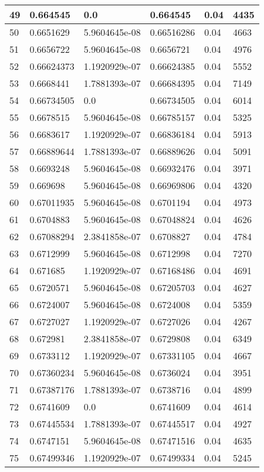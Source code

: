 \begin{longtable}{|l|l|l|l|l|l|}
49 & 0.664545 & 0.0 & 0.664545 & 0.04 & 4435 \\ \hline 
50 & 0.6651629 & 5.9604645e-08 & 0.66516286 & 0.04 & 4663 \\ \hline 
51 & 0.6656722 & 5.9604645e-08 & 0.6656721 & 0.04 & 4976 \\ \hline 
52 & 0.66624373 & 1.1920929e-07 & 0.66624385 & 0.04 & 5552 \\ \hline 
53 & 0.6668441 & 1.7881393e-07 & 0.66684395 & 0.04 & 7149 \\ \hline 
54 & 0.66734505 & 0.0 & 0.66734505 & 0.04 & 6014 \\ \hline 
55 & 0.6678515 & 5.9604645e-08 & 0.66785157 & 0.04 & 5325 \\ \hline 
56 & 0.6683617 & 1.1920929e-07 & 0.66836184 & 0.04 & 5913 \\ \hline 
57 & 0.66889644 & 1.7881393e-07 & 0.66889626 & 0.04 & 5091 \\ \hline 
58 & 0.6693248 & 5.9604645e-08 & 0.66932476 & 0.04 & 3971 \\ \hline 
59 & 0.669698 & 5.9604645e-08 & 0.66969806 & 0.04 & 4320 \\ \hline 
60 & 0.67011935 & 5.9604645e-08 & 0.6701194 & 0.04 & 4973 \\ \hline 
61 & 0.6704883 & 5.9604645e-08 & 0.67048824 & 0.04 & 4626 \\ \hline 
62 & 0.67088294 & 2.3841858e-07 & 0.6708827 & 0.04 & 4784 \\ \hline 
63 & 0.6712999 & 5.9604645e-08 & 0.6712998 & 0.04 & 7270 \\ \hline 
64 & 0.671685 & 1.1920929e-07 & 0.67168486 & 0.04 & 4691 \\ \hline 
65 & 0.6720571 & 5.9604645e-08 & 0.67205703 & 0.04 & 4627 \\ \hline 
66 & 0.6724007 & 5.9604645e-08 & 0.6724008 & 0.04 & 5359 \\ \hline 
67 & 0.6727027 & 1.1920929e-07 & 0.6727026 & 0.04 & 4267 \\ \hline 
68 & 0.672981 & 2.3841858e-07 & 0.6729808 & 0.04 & 6349 \\ \hline 
69 & 0.6733112 & 1.1920929e-07 & 0.67331105 & 0.04 & 4667 \\ \hline 
70 & 0.67360234 & 5.9604645e-08 & 0.6736024 & 0.04 & 3951 \\ \hline 
71 & 0.67387176 & 1.7881393e-07 & 0.6738716 & 0.04 & 4899 \\ \hline 
72 & 0.6741609 & 0.0 & 0.6741609 & 0.04 & 4614 \\ \hline 
73 & 0.67445534 & 1.7881393e-07 & 0.67445517 & 0.04 & 4927 \\ \hline 
74 & 0.6747151 & 5.9604645e-08 & 0.67471516 & 0.04 & 4635 \\ \hline 
75 & 0.67499346 & 1.1920929e-07 & 0.67499334 & 0.04 & 5245 \\ \hline 
\end{longtable}